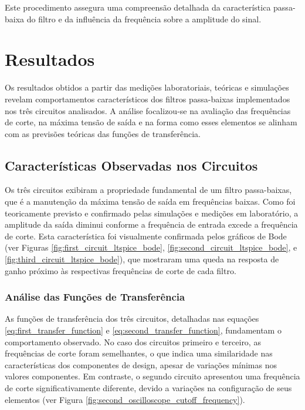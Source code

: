 \documentclass[
	12pt,				%
	openright,			%
	twoside,			%
	a4paper,			%
	english,			%
	french,				%
	spanish,			%
	brazil,				%
	]{abntex2}
\begin{document}
Este procedimento assegura uma compreensão detalhada da característica passa-baixa do filtro e da influência da frequência sobre a amplitude do sinal.


\chapter{Resultados}

Os resultados obtidos a partir das medições laboratoriais, teóricas e simulações revelam comportamentos característicos dos filtros passa-baixas implementados nos três circuitos analisados. A análise focalizou-se na avaliação das frequências de corte, na máxima tensão de saída e na forma como esses elementos se alinham com as previsões teóricas das funções de transferência.

\section{Características Observadas nos Circuitos}

Os três circuitos exibiram a propriedade fundamental de um filtro passa-baixas, que é a manutenção da máxima tensão de saída em frequências baixas. Como foi teoricamente previsto e confirmado pelas simulações e medições em laboratório, a amplitude da saída diminui conforme a frequência de entrada excede a frequência de corte. Esta característica foi visualmente confirmada pelos gráficos de Bode (ver Figuras \ref{fig:first_circuit_ltspice_bode}, \ref{fig:second_circuit_ltspice_bode}, e \ref{fig:third_circuit_ltspice_bode}), que mostraram uma queda na resposta de ganho próximo às respectivas frequências de corte de cada filtro.

\subsection{Análise das Funções de Transferência}

As funções de transferência dos três circuitos, detalhadas nas equações \ref{eq:first_transfer_function} e \ref{eq:second_transfer_function}, fundamentam o comportamento observado. No caso dos circuitos primeiro e terceiro, as frequências de corte foram semelhantes, o que indica uma similaridade nas características dos componentes de design, apesar de variações mínimas nos valores componentes. Em contraste, o segundo circuito apresentou uma frequência de corte significativamente diferente, devido a variações na configuração de seus elementos (ver Figura \ref{fig:second_oscilloscope_cutoff_frequency}).
\end{document}
